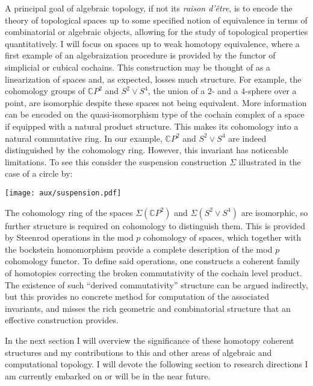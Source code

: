 A principal goal of algebraic topology, if not its \textit{raison d'\^{e}tre}, is to encode the theory of topological spaces up to some specified notion of equivalence in terms of combinatorial or algebraic objects, allowing for the study of topological properties quantitatively.
I will focus on spaces up to weak homotopy equivalence, where a first example of an algebraization procedure is provided by the functor of simplicial or cubical cochains.
This construction may be thought of as a linearization of spaces and, as expected, losses much structure.
For example, the cohomology groups of $\mathbb{C} P^2$ and $S^2 \vee S^4$, the union of a $2$- and a $4$-sphere over a point, are isomorphic despite these spaces not being equivalent.
More information can be encoded on the quasi-isomorphism type of the cochain complex of a space if equipped with a natural product structure.
This makes its cohomology into a natural commutative ring.
In our example, $\mathbb{C} P^2$ and $S^2 \vee S^4$ are indeed distinguished by the cohomology ring.
However, this invariant has noticeable limitations.
To see this consider the suspension construction $\Sigma$ illustrated in the case of a circle by:
\begin{center}
	\texttt{[image: aux/suspension.pdf]}
\end{center}
The cohomology ring of the spaces $\Sigma(\mathbb{C} P^2)$ and $\Sigma(S^2 \vee S^4)$ are isomorphic, so further structure is required on cohomology to distinguish them.
This is provided by Steenrod operations in the mod $p$ cohomology of spaces, which together with the bockstein homomorphism provide a complete description of the mod $p$ cohomology functor.
To define said operations, one constructs a coherent family of homotopies correcting the broken commutativity of the cochain level product.
The existence of such ``derived commutativity'' structure can be argued indirectly, but this provides no concrete method for computation of the associated invariants, and misses the rich geometric and combinatorial structure that an effective construction provides.

In the next section I will overview the significance of these homotopy coherent structures and my contributions to this and other areas of algebraic and computational topology.
I will devote the following section to research directions I am currently embarked on or will be in the near future.